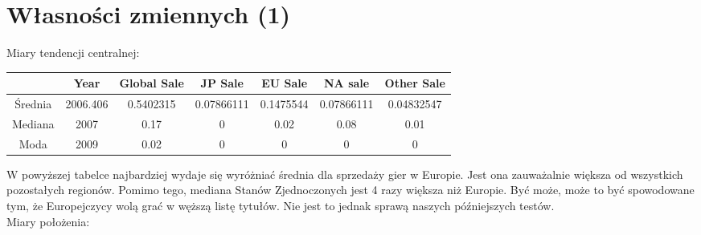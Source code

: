 \documentclass[12pt]{article}
\begin{document}
	\section{Własności zmiennych (1)}
	Miary tendencji centralnej:\\
	\begin{table}[h]
		\centering
		\begin{tabular}{|c|c|c|c|c|c|c|}
			\hline
			\multicolumn{1}{|l|}{} & Year                             & Global Sale  &JP Sale      &EU Sale & NA sale & Other Sale              \\ \hline
			Średnia               & \cellcolor[HTML]{FFFFFF}2006.406 & \cellcolor[HTML]{FFFFFF}0.5402315 & \cellcolor[HTML]{FFFFFF} 0.07866111  & \cellcolor[HTML]{FFFFFF} 0.1475544 & \cellcolor[HTML]{FFFFFF} 0.07866111& \cellcolor[HTML]{FFFFFF} 0.04832547    \\ \hline
			Mediana                & \cellcolor[HTML]{FFFFFF}2007     & \cellcolor[HTML]{FFFFFF}0.17  & \cellcolor[HTML]{FFFFFF}0& \cellcolor[HTML]{FFFFFF}0.02& \cellcolor[HTML]{FFFFFF}0.08& \cellcolor[HTML]{FFFFFF}0.01   \\ \hline
			Moda                   & \cellcolor[HTML]{FFFFFF}2009     & \cellcolor[HTML]{FFFFFF}0.02    & \cellcolor[HTML]{FFFFFF}0  & \cellcolor[HTML]{FFFFFF}0  & \cellcolor[HTML]{FFFFFF}0  & \cellcolor[HTML]{FFFFFF}0      \\ \hline
		\end{tabular}
	\end{table}
	W powyższej tabelce najbardziej wydaje się wyróżniać średnia dla sprzedaży gier w Europie. Jest ona zauważalnie większa od wszystkich pozostałych regionów. Pomimo tego, mediana Stanów Zjednoczonych jest 4 razy większa niż Europie. Być może, może to być spowodowane tym, że Europejczycy wolą grać w węższą listę tytułów. Nie jest to jednak sprawą naszych późniejszych testów.\\ 
	Miary położenia:\\
\end{document}

